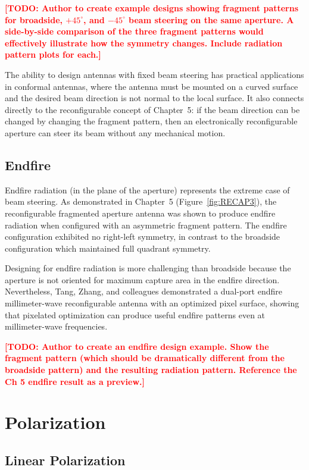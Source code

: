 \textcolor{red}{\textbf{[TODO: Author to create example designs showing fragment patterns for broadside, $+45^\circ$, and $-45^\circ$ beam steering on the same aperture.  A side-by-side comparison of the three fragment patterns would effectively illustrate how the symmetry changes.  Include radiation pattern plots for each.]}}

The ability to design antennas with fixed beam steering has practical applications in conformal antennas, where the antenna must be mounted on a curved surface and the desired beam direction is not normal to the local surface.  It also connects directly to the reconfigurable concept of Chapter~5: if the beam direction can be changed by changing the fragment pattern, then an electronically reconfigurable aperture can steer its beam without any mechanical motion.

\subsection{Endfire}

Endfire radiation (in the plane of the aperture) represents the extreme case of beam steering.  As demonstrated in Chapter~5 (Figure~\ref{fig:RECAP3}), the reconfigurable fragmented aperture antenna was shown to produce endfire radiation when configured with an asymmetric fragment pattern.  The endfire configuration exhibited no right-left symmetry, in contrast to the broadside configuration which maintained full quadrant symmetry.

Designing for endfire radiation is more challenging than broadside because the aperture is not oriented for maximum capture area in the endfire direction.  Nevertheless, Tang, Zhang, and colleagues \cite{Tang2023Dual-port} demonstrated a dual-port endfire millimeter-wave reconfigurable antenna with an optimized pixel surface, showing that pixelated optimization can produce useful endfire patterns even at millimeter-wave frequencies.

\textcolor{red}{\textbf{[TODO: Author to create an endfire design example.  Show the fragment pattern (which should be dramatically different from the broadside pattern) and the resulting radiation pattern.  Reference the Ch 5 endfire result as a preview.]}}

\section{Polarization}
\label{sec:ch4pol}

\subsection{Linear Polarization}

